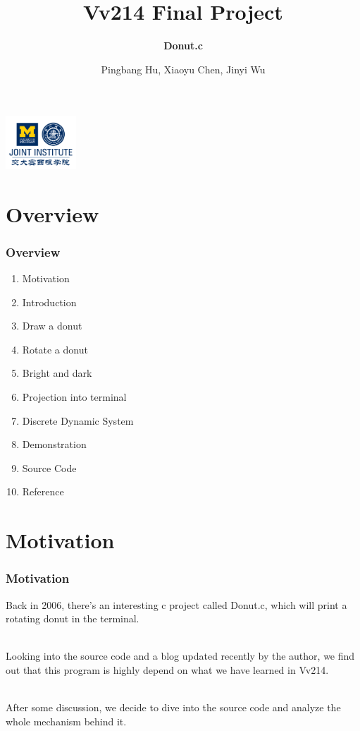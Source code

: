 \documentclass[12pt, t]{beamer}
\title{Vv214 Final Project}
\subtitle{\textbf{Donut.c}}
\institute[UM-SJTU JI]{University of Michigan-Shanghai Jiao Tong University Joint Institute}
\author{Pingbang Hu, Xiaoyu Chen, Jinyi Wu}
\newcommand{\nullspace}{~\\[15pt]}
\begin{document}
\begin{frame}
    \titlepage
    \begin{center}
        \includegraphics[height=2cm]{Figures/logo/logo2.png}
    \end{center}
\end{frame}

\section{Overview}
    \begin{frame}
        \frametitle{Overview}
        \begin{enumerate}
            \item Motivation
            \item Introduction
            \item Draw a donut
            \item Rotate a donut
            \item Bright and dark
            \item Projection into terminal
            \item Discrete Dynamic System
            \item Demonstration
            \item Source Code
            \item Reference
        \end{enumerate}
    \end{frame}


\section{Motivation}
\begin{frame}
    \frametitle{Motivation}

    Back in 2006, there's an interesting c project called Donut.c, which will print a rotating 
    donut in the terminal.

    \nullspace
    Looking into the source code and a blog updated recently by the author, we find out 
    that this program is highly depend on what we have learned in Vv214.

    \nullspace
    After some discussion, we decide to dive into the source code and analyze the whole mechanism 
    behind it.

\end{frame}
\end{document}
